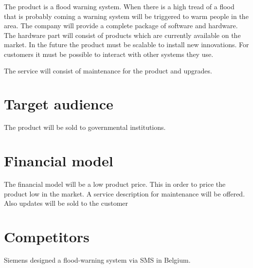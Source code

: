 The product is a flood warning system. When there is a high tread of a flood that is probably coming a warning system will be triggered to warm people in the area. The company will provide a complete package of software and hardware. The hardware part will consist of products which are currently available on the market. In the future the product must be scalable to install new innovations. For customers it must be possible to interact with other systems they use.

The service will consist of maintenance for the product and upgrades.

\section{Target audience}
The product will be sold to governmental institutions. 

\section{Financial model}
The financial model will be a low product price. This in order to price the product low in the market. A service description for maintenance will be offered. Also updates will be sold to the customer

\section{Competitors}
Siemens designed a flood-warning system via SMS in Belgium.




